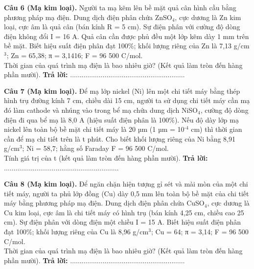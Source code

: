 \documentclass{article}
\begin{document}
\fontsize{24}{32}\selectfont
\textbf{Câu 6 (Mạ kim loại).} Người ta mạ kẽm lên bề mặt quả cân hình cầu bằng phương pháp mạ điện. Dung dịch điện phân chứa ZnSO$_{\text{4}}$, cực dương là Zn kim loại, cực âm là quả cân (bán kính R = 5 cm). Sự điện phân với cường độ dòng điện không đổi I = 16 A. Quả cân cần được phủ đều một lớp kẽm dày 1 mm trên bề mặt. Biết hiệu suất điện phân đạt 100\%; khối lượng riêng của Zn là 7,13 g/cm$^{\text{3}}$; Zn = 65,38; π = 3,1416; F = 96 500 C/mol.\\ 
Thời gian của quá trình mạ điện là bao nhiêu giờ? (Kết quả làm tròn đến hàng phần mười).
\vspace{12pt}
\textbf{Trả lời:} $\dots\dots\dots\dots\dots\dots\dots\dots\dots\dots\dots\dots\dots\dots\dots\dots\dots\dots\dots\dots$
\vspace*{\fill}
\newpage

\fontsize{24}{32}\selectfont
\textbf{Câu 7 (Mạ kim loại).} Để mạ lớp nickel (Ni) lên một chi tiết máy bằng thép hình trụ đường kính 7 cm, chiều dài 15 cm, người ta sử dụng chi tiết máy cần mạ đó làm cathode và nhúng vào trong bể mạ chứa dung dịch NiSO$_{\text{4}}$, cường độ dòng điện đi qua bể mạ là 8,0 A (hiệu suất điện phân là 100\%). Nếu độ dày lớp mạ nickel lên toàn bộ bề mặt chi tiết máy là 20 µm (1 µm = 10$^{\text{-4}}$ cm) thì thời gian cần để mạ chi tiết trên là t phút. Cho biết khối lượng riêng của Ni bằng 8,91 g/cm$^{\text{3}}$; Ni = 58,7; hằng số Faraday F = 96 500 C/mol.\\ 
Tính giá trị của t (kết quả làm tròn đến hàng phần mười).
\vspace{12pt}
\textbf{Trả lời:} $\dots\dots\dots\dots\dots\dots\dots\dots\dots\dots\dots\dots\dots\dots\dots\dots\dots\dots\dots\dots$
\vspace*{\fill}
\newpage

\fontsize{24}{32}\selectfont
\textbf{Câu 8 (Mạ kim loại).} Để ngăn chặn hiện tượng gỉ sét và mài mòn của một chi tiết máy, người ta phủ lớp đồng (Cu) dày 0,5 mm lên toàn bộ bề mặt của chi tiết máy bằng phương pháp mạ điện. Dung dịch điện phân chứa CuSO$_{\text{4}}$, cực dương là Cu kim loại, cực âm là chi tiết máy có hình trụ (bán kính 4,25 cm, chiều cao 25 cm). Sự điện phân với dòng điện một chiều I = 15 A. Biết hiệu suất điện phân đạt 100\%; khối lượng riêng của Cu là 8,96 g/cm$^{\text{3}}$; Cu = 64; π = 3,14; F = 96 500 C/mol.\\ 
Thời gian của quá trình mạ điện là bao nhiêu giờ? (Kết quả làm tròn đến hàng phần mười).
\vspace{12pt}
\textbf{Trả lời:} $\dots\dots\dots\dots\dots\dots\dots\dots\dots\dots\dots\dots\dots\dots\dots\dots\dots\dots\dots\dots$
\vspace*{\fill}
\newpage
\end{document}
